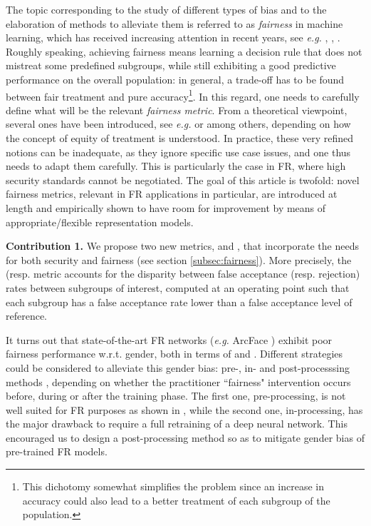\documentclass[nohyperref]{article}
\theoremstyle{plain}
\theoremstyle{definition}
\theoremstyle{remark}
\begin{document}
The topic corresponding to the study of different types of bias and to the elaboration of methods to alleviate them is referred to as {\it fairness} in machine learning, which has received increasing attention in recent years, see \textit{e.g.} \cite{survey_fairness_ML}, \cite{caton2020fairness}, \cite{fairness_DL}. Roughly speaking, achieving fairness means learning a decision rule that does not mistreat some predefined subgroups, while still exhibiting a good predictive performance on the overall population: in general, a trade-off has to be found between fair treatment and pure accuracy\footnote{This dichotomy somewhat simplifies the problem since an increase in accuracy could also lead to a better treatment of each subgroup of the population.}. In this regard, one needs to carefully define what will be the relevant {\it fairness metric}. From a theoretical viewpoint, several ones have been introduced, see \textit{e.g.} \cite{garg2020fairness} or \cite{castelnovo2021zoo} among others, depending on how the concept of equity of treatment is understood. In practice, these very refined notions can be inadequate, as they ignore specific use case issues, and one thus needs to adapt them carefully. This is particularly the case in FR, where high security standards cannot be negotiated. The goal of this article is twofold: novel fairness metrics, relevant in FR applications in particular, are introduced at length and empirically shown to have room for improvement by means of appropriate/flexible representation models.

{\bf Contribution 1.} We propose two new metrics,  and , that incorporate the needs for both security and fairness (see section \ref{subsec:fairness}). More precisely, the  (resp.  metric accounts for the disparity between false acceptance (resp. rejection) rates between subgroups of interest, computed at an operating point such that each subgroup has a false acceptance rate lower than a false acceptance level of reference.

It turns out that state-of-the-art FR networks ({\it e.g.} ArcFace \cite{arcface}) exhibit poor fairness performance w.r.t. gender, both in terms of  and . Different strategies could be considered to alleviate this gender bias:  pre-, in- and post-processsing methods \cite{caton2020fairness}, depending on whether the practitioner ``fairness" intervention occurs before, during or after the training phase. The first one, pre-processing, is not well suited for FR purposes as shown in \cite{gender_balanced_data}, while the second one, in-processing, has the major drawback to require a full retraining of a deep neural network. This encouraged us to design a post-processing method so as to mitigate gender bias of pre-trained FR models.
\end{document}
